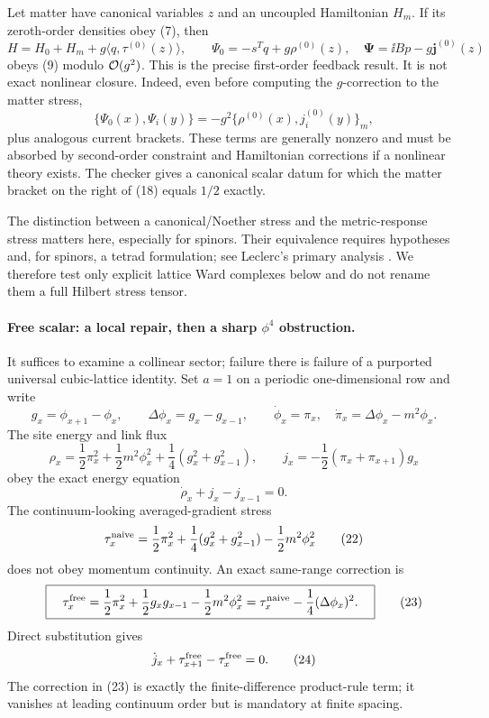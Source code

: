 Let matter have canonical variables $z$ and an uncoupled Hamiltonian $H_m$.
If its zeroth-order densities obey (7), then
\[
 H=H_0+H_m+g\langle q,\tau^{(0)}(z)\rangle,\qquad
 \Psi_0=-s^Tq+g\rho^{(0)}(z),\quad
 \boldsymbol\Psi=\ii Bp-g\boldsymbol j^{(0)}(z)                 \tag{17}
\]
obeys (9) modulo $\mathcal O(g^2)$.  This is the precise first-order feedback result.
It is not exact nonlinear closure.  Indeed, even before computing the
$g$-correction to the matter stress,
\[
 \{\Psi_0(x),\Psi_i(y)\}
 =-g^2\{\rho^{(0)}(x),j_i^{(0)}(y)\}_m,           \tag{18}
\]
plus analogous current brackets.  These terms are generally nonzero and must
be absorbed by second-order constraint and Hamiltonian corrections if a
nonlinear theory exists.  The checker gives a canonical scalar datum for which
the matter bracket on the right of (18) equals $1/2$ exactly.

The distinction between a canonical/Noether stress and the metric-response
stress matters here, especially for spinors.  Their equivalence requires
hypotheses and, for spinors, a tetrad formulation; see Leclerc's primary
analysis \cite{toe-r7-matter-Leclerc}.  We therefore test only explicit lattice Ward
complexes below and do not rename them a full Hilbert stress tensor.

\paragraph{Free scalar: a local repair, then a sharp $\phi^4$ obstruction.}

It suffices to examine a collinear sector; failure there is failure of a
purported universal cubic-lattice identity.  Set $a=1$ on a periodic
one-dimensional row and write
\[
 g_x=\phi_{x+1}-\phi_x,\qquad
 \Delta\phi_x=g_x-g_{x-1},\qquad
 \dot\phi_x=\pi_x,\quad
 \dot\pi_x=\Delta\phi_x-m^2\phi_x.                \tag{19}
\]
The site energy and link flux
\[
 \rho_x=\frac12\pi_x^2+\frac12m^2\phi_x^2
 +\frac14(g_x^2+g_{x-1}^2),\qquad
 j_x=-\frac12(\pi_x+\pi_{x+1})g_x                \tag{20}
\]
obey the exact energy equation
\[
 \dot\rho_x+j_x-j_{x-1}=0.                        \tag{21}
\]
The continuum-looking averaged-gradient stress
\[
 \tau_x^{\rm naive}=\frac12\pi_x^2
 +\frac14(g_x^2+g_{x-1}^2)-\frac12m^2\phi_x^2    \tag{22}
\]
does not obey momentum continuity.  An exact same-range correction is
\[
 \boxed{\quad
 \tau_x^{\rm free}=\frac12\pi_x^2+\frac12g_xg_{x-1}
 -\frac12m^2\phi_x^2
 =\tau_x^{\rm naive}-\frac14(\Delta\phi_x)^2 .\quad} \tag{23}
\]
Direct substitution gives
\[
 \dot j_x+\tau_{x+1}^{\rm free}-\tau_x^{\rm free}=0. \tag{24}
\]
The correction in (23) is exactly the finite-difference product-rule term;
it vanishes at leading continuum order but is mandatory at finite spacing.

